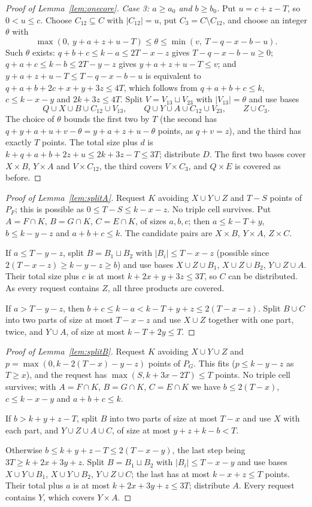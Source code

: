 \documentclass[11pt]{article}
\numberwithin{equation}{section}
\theoremstyle{definition}
\theoremstyle{remark}
\begin{document}
\begin{proof}[Proof of Lemma~\ref{lem:onecore}]
\emph{Case 3: $a\ge a_0$ and $b\ge b_0$.} Put $u=c+z-T$, so $0<u\le c$.
Choose $C_{12}\subseteq C$ with $|C_{12}|=u$, put $C_3=C\setminus C_{12}$,
and choose an integer $\theta$ with
\[
 \max(0,\ y+a+z+u-T)\le\theta\le\min(v,\ T-q-x-b-u).
\]
Such $\theta$ exists: $q+b+c\le k-a\le2T-x-z$ gives $T-q-x-b-u\ge0$;
$q+a+c\le k-b\le2T-y-z$ gives $y+a+z+u-T\le v$; and
$y+a+z+u-T\le T-q-x-b-u$ is equivalent to $q+a+b+2c+x+y+3z\le4T$, which
follows from $q+a+b+c\le k$, $c\le k-x-y$ and $2k+3z\le4T$. Split
$V=V_{13}\sqcup V_{23}$ with $|V_{13}|=\theta$ and use bases
\[
 Q\cup X\cup B\cup C_{12}\cup V_{13},\qquad
 Q\cup Y\cup A\cup C_{12}\cup V_{23},\qquad Z\cup C_3 .
\]
The choice of $\theta$ bounds the first two by $T$ (the second has
$q+y+a+u+v-\theta=y+a+z+u-\theta$ points, as $q+v=z$), and the third has
exactly $T$ points. The total size plus $d$ is
$k+q+a+b+2z+u\le2k+3z-T\le3T$; distribute $D$. The first two bases cover
$X\times B$, $Y\times A$ and $V\times C_{12}$, the third covers
$V\times C_3$, and $Q\times E$ is covered as before.
\end{proof}

\begin{proof}[Proof of Lemma~\ref{lem:splitA}]
Request $K$ avoiding $X\cup Y\cup Z$ and $T-S$ points of $P_F$; this is
possible as $0\le T-S\le k-x-z$. No triple cell survives. Put
$A=F\cap K$, $B=G\cap K$, $C=E\cap K$, of sizes $a,b,c$; then
$a\le k-T+y$, $b\le k-y-z$ and $a+b+c\le k$. The candidate pairs are
$X\times B$, $Y\times A$, $Z\times C$.

If $a\le T-y-z$, split $B=B_1\sqcup B_2$ with $|B_i|\le T-x-z$ (possible
since $2(T-x-z)\ge k-y-z\ge b$) and use bases $X\cup Z\cup B_1$,
$X\cup Z\cup B_2$, $Y\cup Z\cup A$. Their total size plus $c$ is at most
$k+2x+y+3z\le3T$, so $C$ can be distributed. As every request contains
$Z$, all three products are covered.

If $a>T-y-z$, then $b+c\le k-a<k-T+y+z\le2(T-x-z)$. Split $B\cup C$ into
two parts of size at most $T-x-z$ and use $X\cup Z$ together with one
part, twice, and $Y\cup A$, of size at most $k-T+2y\le T$.
\end{proof}

\begin{proof}[Proof of Lemma~\ref{lem:splitB}]
Request $K$ avoiding $X\cup Y\cup Z$ and $p=\max(0,k-2(T-x)-y-z)$ points of
$P_G$. This fits ($p\le k-y-z$ as $T\ge x$), and the request has
$\max(S,k+3x-2T)\le T$ points. No triple cell survives; with
$A=F\cap K$, $B=G\cap K$, $C=E\cap K$ we have $b\le2(T-x)$,
$c\le k-x-y$ and $a+b+c\le k$.

If $b>k+y+z-T$, split $B$ into two parts of size at most $T-x$ and use
$X$ with each part, and $Y\cup Z\cup A\cup C$, of size at most
$y+z+k-b<T$.

Otherwise $b\le k+y+z-T\le2(T-x-y)$, the last step being
$3T\ge k+2x+3y+z$. Split $B=B_1\sqcup B_2$ with $|B_i|\le T-x-y$ and use
bases $X\cup Y\cup B_1$, $X\cup Y\cup B_2$, $Y\cup Z\cup C$; the last has
at most $k-x+z\le T$ points. Their total plus $a$ is at most
$k+2x+3y+z\le3T$; distribute $A$. Every request contains $Y$, which
covers $Y\times A$.
\end{proof}
\end{document}
